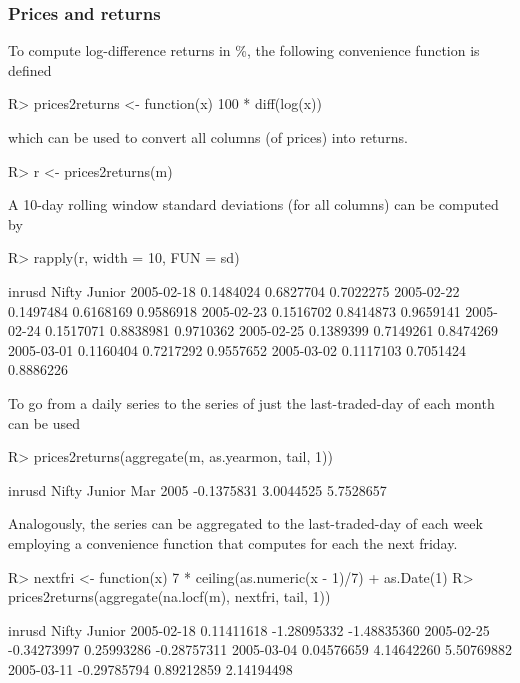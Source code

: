 \documentclass{Z}
\newcommand{\mysection}[1]{\subsubsection[#1]{\textbf{#1}}}
\begin{document}
\mysection{Prices and returns}

To compute log-difference returns in \%, the following
convenience function is defined
\begin{Schunk}
\begin{Sinput}
R> prices2returns <- function(x) 100 * diff(log(x))
\end{Sinput}
\end{Schunk}
which can be used to convert all columns (of prices) into returns.
\begin{Schunk}
\begin{Sinput}
R> r <- prices2returns(m)
\end{Sinput}
\end{Schunk}

A 10-day rolling window standard deviations (for all columns) can
be computed by
\begin{Schunk}
\begin{Sinput}
R> rapply(r, width = 10, FUN = sd)
\end{Sinput}
\begin{Soutput}
           inrusd    Nifty     Junior   
2005-02-18 0.1484024 0.6827704 0.7022275
2005-02-22 0.1497484 0.6168169 0.9586918
2005-02-23 0.1516702 0.8414873 0.9659141
2005-02-24 0.1517071 0.8838981 0.9710362
2005-02-25 0.1389399 0.7149261 0.8474269
2005-03-01 0.1160404 0.7217292 0.9557652
2005-03-02 0.1117103 0.7051424 0.8886226
\end{Soutput}
\end{Schunk}

To go from a daily series to the series of just the last-traded-day of each month
 can be used
\begin{Schunk}
\begin{Sinput}
R> prices2returns(aggregate(m, as.yearmon, tail, 1))
\end{Sinput}
\begin{Soutput}
         inrusd     Nifty      Junior    
Mar 2005 -0.1375831  3.0044525  5.7528657
\end{Soutput}
\end{Schunk}

Analogously, the series can be aggregated to the last-traded-day of each week
employing a convenience function  that computes for each 
the next friday.
\begin{Schunk}
\begin{Sinput}
R> nextfri <- function(x) 7 * ceiling(as.numeric(x - 1)/7) + as.Date(1)
R> prices2returns(aggregate(na.locf(m), nextfri, tail, 1))
\end{Sinput}
\begin{Soutput}
           inrusd      Nifty       Junior     
2005-02-18  0.11411618 -1.28095332 -1.48835360
2005-02-25 -0.34273997  0.25993286 -0.28757311
2005-03-04  0.04576659  4.14642260  5.50769882
2005-03-11 -0.29785794  0.89212859  2.14194498
\end{Soutput}
\end{Schunk}
\end{document}
